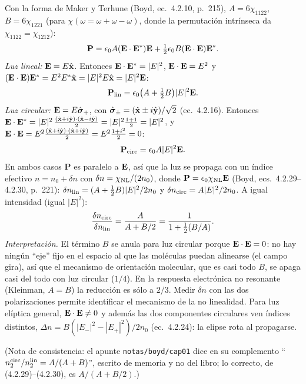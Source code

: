  Con la forma de Maker y Terhune (Boyd, ec.~4.2.10, p.~215), $A=6\chi_{1122}$, $B=6\chi_{1221}$ (para $\chi(\omega=\omega+\omega-\omega)$, donde la permutación intrínseca da $\chi_{1122}=\chi_{1212}$):
\[
\mathbf P=\epsilon_0A(\mathbf E\cdot\mathbf E^*)\mathbf E+\tfrac12\epsilon_0B(\mathbf E\cdot\mathbf E)\mathbf E^*.
\]
\emph{Luz lineal:} $\mathbf E=E\hat{\mathbf x}$. Entonces $\mathbf E\cdot\mathbf E^*=|E|^2$, $\mathbf E\cdot\mathbf E=E^2$ y $(\mathbf E\cdot\mathbf E)\mathbf E^*=E^2E^*\hat{\mathbf x}=|E|^2E\hat{\mathbf x}=|E|^2\mathbf E$:
\[
\mathbf P_{\rm lin}=\epsilon_0\big(A+\tfrac12B\big)|E|^2\mathbf E.
\]
\emph{Luz circular:} $\mathbf E=E\hat{\boldsymbol\sigma}_+$, con $\hat{\boldsymbol\sigma}_\pm=(\hat{\mathbf x}\pm i\hat{\mathbf y})/\sqrt2$ (ec.~4.2.16). Entonces $\mathbf E\cdot\mathbf E^*=|E|^2\,\frac{(\hat{\mathbf x}+i\hat{\mathbf y})\cdot(\hat{\mathbf x}-i\hat{\mathbf y})}{2}=|E|^2\frac{1+1}{2}=|E|^2$, y $\mathbf E\cdot\mathbf E=E^2\frac{(\hat{\mathbf x}+i\hat{\mathbf y})\cdot(\hat{\mathbf x}+i\hat{\mathbf y})}{2}=E^2\frac{1+i^2}{2}=0$:
\[
\mathbf P_{\rm circ}=\epsilon_0A|E|^2\mathbf E.
\]
En ambos casos $\mathbf P$ es paralelo a $\mathbf E$, así que la luz se propaga con un índice efectivo $n=n_0+\delta n$ con $\delta n=\chi_{\rm NL}/(2n_0)$, donde $\mathbf P=\epsilon_0\chi_{\rm NL}\mathbf E$ (Boyd, ecs.~4.2.29--4.2.30, p.~221): $\delta n_{\rm lin}=(A+\tfrac12B)|E|^2/2n_0$ y $\delta n_{\rm circ}=A|E|^2/2n_0$. A igual intensidad (igual $|E|^2$):
\[
\frac{\delta n_{\rm circ}}{\delta n_{\rm lin}}=\frac{A}{A+B/2}=\frac{1}{1+\frac12(B/A)}.
\]
\emph{Interpretación.} El término $B$ se anula para luz circular porque $\mathbf E\cdot\mathbf E=0$: no hay ningún ``eje'' fijo en el espacio al que las moléculas puedan alinearse (el campo gira), así que el mecanismo de orientación molecular, que es casi todo $B$, se apaga casi del todo con luz circular ($1/4$). En la respuesta electrónica no resonante (Kleinman, $A=B$) la reducción es sólo a $2/3$. Medir $\delta n$ con las dos polarizaciones permite identificar el mecanismo de la no linealidad. Para luz elíptica general, $\mathbf E\cdot\mathbf E\neq0$ y además las dos componentes circulares ven índices distintos, $\Delta n=B(|E_-|^2-|E_+|^2)/2n_0$ (ec.~4.2.24): la elipse rota al propagarse.

(Nota de consistencia: el apunte \texttt{notas/boyd/cap01} dice en su complemento ``$n_2^{\rm circ}/n_2^{\rm lin}=A/(A+B)$'', escrito de memoria y no del libro; lo correcto, de (4.2.29)--(4.2.30), es $A/(A+B/2)$.)

